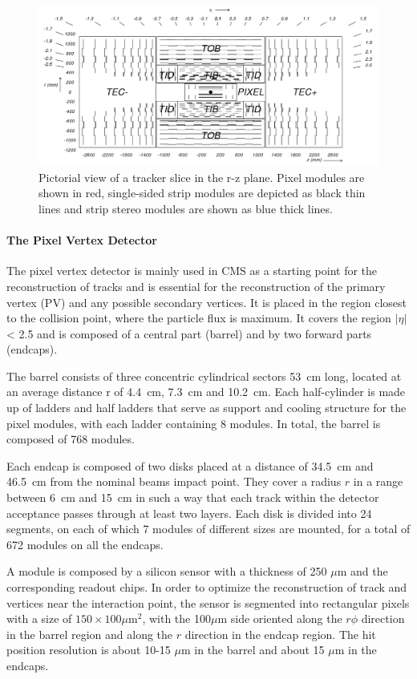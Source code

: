 \begin{figure}
\centering
\includegraphics[scale= 0.3]{../Cap2/fig_cmstracker}
\caption{Pictorial view of a tracker slice in the r-z plane. Pixel modules are shown in
red, single-sided strip modules are depicted as black thin lines and strip stereo modules are
shown as blue thick lines.}
\label{fig_cmstracker}
\end{figure}

\paragraph*{The Pixel Vertex Detector} The pixel vertex detector is mainly used in CMS as a starting point for
the reconstruction of tracks and is essential for the reconstruction of the primary vertex
(PV) and any possible secondary vertices. It is placed in the region closest to the collision
point, where the particle flux is maximum. It covers the region $|\eta|$ < 2.5 and is composed
of a central part (barrel) and by two forward parts (endcaps).

The barrel consists of
three concentric cylindrical sectors 53~cm long, located at an average distance r of 4.4~cm,
7.3~cm and 10.2~cm. Each half-cylinder is made up of ladders and half ladders that serve
as support and cooling structure for the pixel modules, with each ladder containing 8
modules. In total, the barrel is composed of 768 modules.

Each endcap is composed of
two disks placed at a distance of 34.5~cm and 46.5~cm from the nominal beams impact
point. They cover a radius $r$ in a range between 6~cm and 15~cm in such a way that each
track within the detector acceptance passes through at least two layers. Each disk is
divided into 24 segments, on each of which 7 modules of different sizes are mounted, for
a total of 672 modules on all the endcaps.

A module is composed by a silicon sensor with a thickness of
250 $\mu$m and the corresponding readout chips. In
order to optimize the reconstruction of track and vertices near the
interaction point, the sensor is segmented into rectangular pixels
with a size of $150\times100\mu$m$^2$, with the 100$\mu$m side 
oriented along the $r \phi$ direction in the barrel region and along the $r$ direction in the endcap
region. The hit position resolution is about 10-15 $\mu$m in the barrel and
about 15 $\mu$m in the endcaps.

